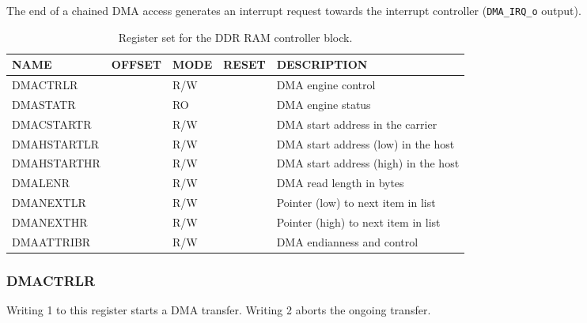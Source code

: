 \documentclass[10pt,a4paper]{cerndoc}
\begin{document}
The end of a chained DMA access generates an interrupt request towards the interrupt controller (\verb+DMA_IRQ_o+ output).  

\begin{table}[htbp]
  \centering
  \begin{tabularx}{\textwidth}{|l|r|l|l|X|}                                                     \hline
    \textbf{NAME}  & \textbf{OFFSET} & \textbf{MODE} & \textbf{RESET} & \textbf{DESCRIPTION}  \\ \hline \hline
    DMACTRLR       & & R/W & & DMA engine control                                             \\ \hline
    DMASTATR       & & RO  & & DMA engine status                                              \\ \hline
    DMACSTARTR     & & R/W & & DMA start address in the carrier                               \\ \hline
    DMAHSTARTLR    & & R/W & & DMA start address (low) in the host                            \\ \hline
    DMAHSTARTHR    & & R/W & & DMA start address (high) in the host                           \\ \hline
    DMALENR        & & R/W & & DMA read length in bytes                                       \\ \hline
    DMANEXTLR      & & R/W & & Pointer (low) to next item in list                             \\ \hline
    DMANEXTHR      & & R/W & & Pointer (high) to next item in list                            \\ \hline
    DMAATTRIBR     & & R/W & & DMA endianness and control                                     \\ \hline
  \end{tabularx}
  \caption{Register set for the DDR RAM controller block.}
  \label{tab:ddr_control}
\end{table}

\subsubsection{DMACTRLR}
Writing 1 to this register starts a DMA transfer. Writing 2 aborts the ongoing transfer.
\end{document}
